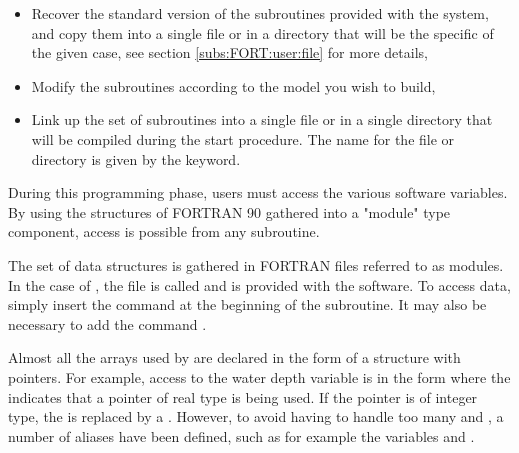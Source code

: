 \begin{itemize}
\item Recover the standard version of the subroutines provided with the system,
and copy them into a single file or in a directory that will be the specific
 of the given case, see section \ref{subs:FORT:user:file}
for more details,

\item Modify the subroutines according to the model you wish to build,

\item Link up the set of subroutines into a single file or in a single directory
that will be compiled during the  start procedure.
The name for the file or directory is given by the  keyword.
\end{itemize}

During this programming phase, users must access the various software variables.
By using the structures of FORTRAN 90 gathered into a "module" type component,
access is possible from any subroutine.

The set of data structures is gathered in FORTRAN files referred to as modules.
In the case of , the file is called 
and is provided with the software.
To access  data, simply insert the command
 at the beginning of the subroutine.
It may also be necessary to add the command .


Almost all the arrays used by  are declared in the form of
a structure with pointers.
For example, access to the water depth variable is in the form 
where the  indicates that a pointer of real type is being used.
If the pointer is of integer type, the  is replaced by a
.
However, to avoid having to handle too many  and ,
a number of aliases have been defined, such as for example the variables
 and .

